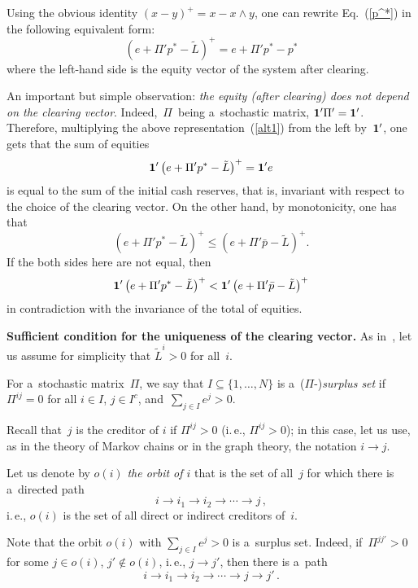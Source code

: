 \begin{multicols}{2}
Using the obvious identity $(x-y)^+=x -x\wedge y$, one can rewrite 
Eq.~(\ref{p^*}) in the following equivalent form:
\begin{equation}
\label{alt1}
\left(e+\Pi'p^*-\tilde L\right)^+=e+\Pi'p^*-p^*
\end{equation}
where the left-hand side is the equity vector of the system after clearing.


An important but simple observation: {\it the equity (after clearing) does not 
depend on the clearing vector}.
Indeed,~$\Pi$~being  a~stochastic matrix, ${\bf 1}'\Pi'={\bf 1}'$.  Therefore, 
multiplying  the above representation~(\ref{alt1}) from the left by~${\bf 1}'$, 
one gets that  the sum of equities
$$
{\bf 1}'\left(e+\Pi'p^*-\tilde L\right)^+={\bf 1}'e
$$
is equal to the sum of the initial cash reserves, that is, invariant with respect 
to the choice of the clearing vector.
On the other hand, by monotonicity, one has that
$$
\left(e+\Pi'p^*-\tilde L\right)^+\le \left(e+\Pi'\bar p-\tilde L\right)^+.
$$
If the both sides here are not equal, then
$$
{\bf 1}'\left(e+\Pi'p^* - \tilde L\right)^+< {\bf 1}'\left(e+\Pi'\bar p-\tilde L\right)^+$$
in contradiction with the invariance of the  total of equities.

\smallskip

\noindent
\textbf{Sufficient condition for the uniqueness of the clearing vector.}
As in~\cite{Eisenberg-Noe}, let us assume for simplicity that $\tilde L^i>0$ 
for all~$i$.

For a~stochastic matrix~$\Pi$,  we say that
$I\subseteq  \{1,\ldots,N\}$ is
a~($\Pi$-)\textit{surplus set} if $\Pi^{ij}=0$ for all $i\in I$, $j\in I^c$, 
and~$\sum_{j\in I}e^j>0$.

\columnbreak

Recall that~$j$ is the creditor of $i$ if $\Pi^{ij}>0$ (i.\,e., $\Pi^{ij}>0$); in 
this case, let us use, as in the  theory of Markov chains or in the graph 
theory,  the notation $i\to j$.

Let us denote by $o(i)$ {\it the orbit of $i$} that is the set of all~$j$ for which 
there is a~directed path 
$$
i\to i_1\to i_2\to\cdots\to j\,,$$ 
i.\,e.,  $o(i)$ is the set 
of all direct or indirect creditors of~$i$.

Note that the orbit $o(i)$ with $\sum_{j\in I}e^j>0$ is a~surplus set. Indeed,
if\ $\Pi^{jj'}>0$ for some $j\in o(i)$, $j'\notin o(i)$, i.\,e.,  $j\to j'$, then 
there is
a~path 
$$i\to i_1\to i_2\to\cdots\to j \to  j'\,.
$$



\end{multicols}
